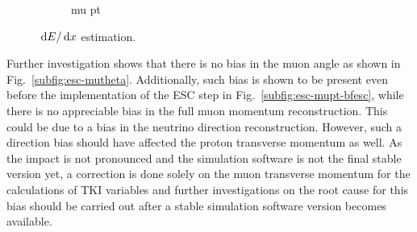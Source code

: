 \begin{figure}
\begin{subfigure}[b]{\dbfigwid\textwidth}
             \caption{mu pt}
             \label{subfig:esc-mupt}
        \end{subfigure}
        \caption{$\,\textrm{d}E/\,\textrm{d}x$ estimation.}
        \label{fig:esc-prmupt}
     \end{figure}
     Further investigation shows that there is no bias in the muon angle as shown in Fig.~\ref{subfig:esc-mutheta}.
     Additionally, such bias is shown to be present even before the implementation of the ESC step in Fig.~\ref{subfig:esc-mupt-bfesc}, while there is no appreciable bias in the full muon momentum reconstruction.
     This could be due to a bias in the neutrino direction reconstruction.
     However, such a direction bias should have affected the proton transverse momentum as well.
     As the impact is not pronounced and the simulation software is not the final stable version yet, a correction is done solely on the muon transverse momentum for the calculations of TKI variables and further investigations on the root cause for this bias should be carried out after a stable simulation software version becomes available.
